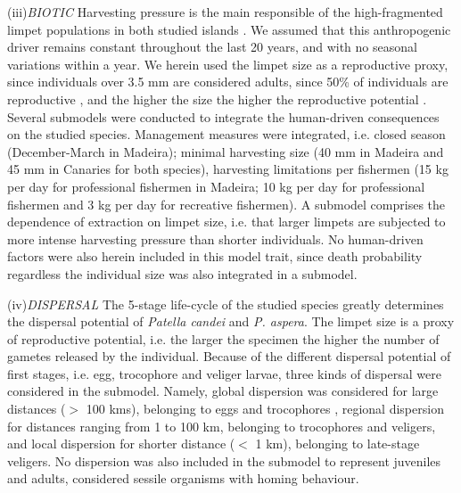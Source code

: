 \documentclass[12pt]{article}
\begin{document}
\begin{justify}
{{{{{(iii)\textit{BIOTIC}
Harvesting pressure is the main responsible of the high-fragmented limpet populations in both studied islands \citep{riera2016clear,sousa2019long}. We assumed that this anthropogenic driver remains constant throughout the last 20 years, and with no seasonal variations within a year. We herein used the limpet size as a reproductive proxy, since individuals over 3.5 mm are considered adults, since 50\% of individuals are reproductive \citep{henriques2012life}, and the higher the size the higher the reproductive potential \citep{boaventura2002analysis, martins2017exploitation}. Several submodels were conducted to integrate the human-driven consequences on the studied species. Management measures were integrated, i.e. closed season (December-March in Madeira); minimal harvesting size (40 mm in Madeira and 45 mm in Canaries for both species), harvesting limitations per fishermen (15 kg per day for professional fishermen in Madeira; 10 kg per day for professional fishermen and 3 kg per day for recreative fishermen). A submodel comprises the dependence of extraction on limpet size, i.e. that larger limpets are subjected to more intense harvesting pressure than shorter individuals.
No human-driven factors were also herein included in this model trait, since death probability regardless the individual size was also integrated in a submodel.

(iv)\textit{DISPERSAL}
The 5-stage life-cycle of the studied species greatly determines the dispersal potential of \textit{Patella candei} and \textit{P. aspera}. The limpet size is a proxy of reproductive potential, i.e. the larger the specimen the higher the number of gametes released by the individual. Because of the different dispersal potential of first stages, i.e. egg, trocophore and veliger larvae, three kinds of dispersal were considered in the submodel. Namely, global dispersion was considered for large distances ($>$ 100 kms), belonging to eggs and trocophores , regional dispersion for distances ranging from 1 to 100 km, belonging to trocophores and veligers, and local dispersion for shorter distance ($<$ 1 km), belonging to late-stage veligers. No dispersion was also included in the submodel to represent juveniles and adults, considered sessile organisms with homing behaviour.

}}}}}
\end{justify}
\end{document}
